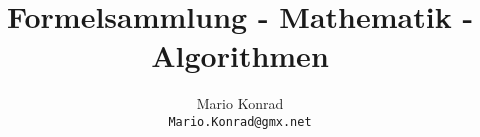 \documentclass[10pt,a4paper,oneside]{book}
\begin{document}
\title{Formelsammlung - Mathematik - Algorithmen}
\author{Mario Konrad\\\texttt{Mario.Konrad@gmx.net}}
\maketitle
\tableofcontents

\end{document}

